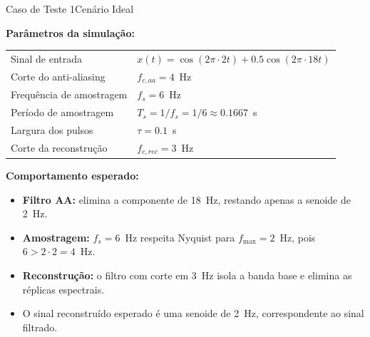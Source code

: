 \begin{frame}{Caso de Teste 1}{Cenário Ideal}
	\small
	
	\textbf{Parâmetros da simulação:}
	
	\begin{center}
		\begin{tabular}{ll}
			\hline
			Sinal de entrada & $x(t)=\cos(2\pi\cdot2t)+0.5\cos(2\pi\cdot18t)$ \\
			Corte do anti-aliasing & $f_{c,aa}=4$~Hz \\
			Frequência de amostragem & $f_s=6$~Hz \\
			Período de amostragem & $T_s=1/f_s=1/6\approx0.1667$~s \\
			Largura dos pulsos & $\tau=0.1$~s \\
			Corte da reconstrução & $f_{c,rec}=3$~Hz \\
			\hline
		\end{tabular}
	\end{center}
	
	\vspace{0.5em}
	
	\textbf{Comportamento esperado:}
	
	\begin{itemize}
		\item \textbf{Filtro AA:} elimina a componente de 18~Hz, restando apenas a senoide de 2~Hz.
		\item \textbf{Amostragem:} $f_s=6$~Hz respeita Nyquist para $f_{\max}=2$~Hz, pois
		$6>2\cdot2=4$~Hz.
		\item \textbf{Reconstrução:} o filtro com corte em $3$~Hz isola a banda base e elimina as réplicas espectrais.
		\item O sinal reconstruído esperado é uma senoide de 2~Hz, correspondente ao sinal filtrado.
	\end{itemize}
	
\end{frame}



